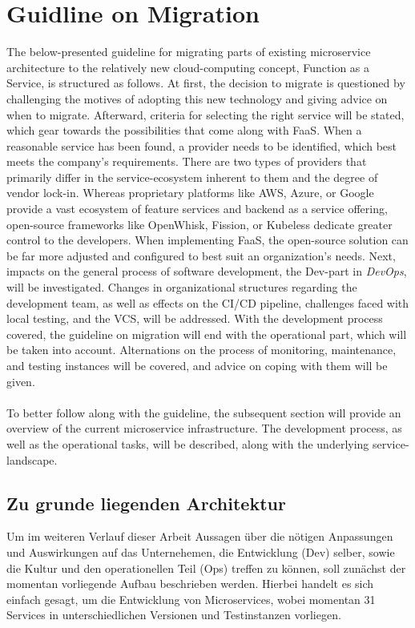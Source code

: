 \documentclass[11pt]{article}
\begin{document}
\section{Guidline on Migration}
The below-presented guideline for migrating parts of existing microservice architecture to the relatively new cloud-computing concept, Function as a Service, is structured as follows. At first, the decision to migrate is questioned by challenging the motives of adopting this new technology and giving advice on when to migrate. Afterward, criteria for selecting the right service will be stated, which gear towards the possibilities that come along with FaaS. When a reasonable service has been found, a provider needs to be identified, which best meets the company's requirements. There are two types of providers that primarily differ in the service-ecosystem inherent to them and the degree of vendor lock-in. Whereas proprietary platforms like AWS, Azure, or Google provide a vast ecosystem of feature services and backend as a service offering, open-source frameworks like OpenWhisk, Fission, or Kubeless dedicate greater control to the developers. When implementing FaaS, the open-source solution can be far more adjusted and configured to best suit an organization's needs. Next, impacts on the general process of software development, the \glqq Dev\grqq{}-part in \textit{DevOps}, will be investigated. Changes in organizational structures regarding the development team, as well as effects on the CI/CD pipeline, challenges faced with local testing, and the VCS, will be addressed. With the development process covered, the guideline on migration will end with the operational part, which will be taken into account. Alternations on the process of monitoring, maintenance, and testing instances will be covered, and advice on coping with them will be given. \\\\
To better follow along with the guideline, the subsequent section will provide an overview of the current microservice infrastructure. The development process, as well as the operational tasks, will be described, along with the underlying service-landscape.




\subsection{Zu grunde liegenden Architektur}
Um im weiteren Verlauf dieser Arbeit Aussagen über die nötigen Anpassungen und Auswirkungen auf das Unternehemen, die Entwicklung (Dev) selber, sowie die Kultur und den operationellen Teil (Ops) treffen zu können, soll zunächst der momentan vorliegende Aufbau beschrieben werden. Hierbei handelt es sich einfach gesagt, um die Entwicklung von Microservices, wobei momentan 31 Services in unterschiedlichen Versionen und Testinstanzen vorliegen. 
\end{document}
